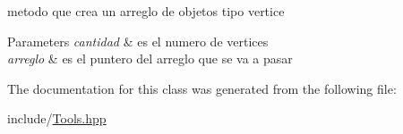 metodo que crea un arreglo de objetos tipo vertice 


\begin{DoxyParams}{Parameters}
{\em cantidad} & es el numero de vertices \\
\hline
{\em arreglo} & es el puntero del arreglo que se va a pasar \\
\hline
\end{DoxyParams}


The documentation for this class was generated from the following file\+:\begin{DoxyCompactItemize}
\item 
include/\hyperlink{_tools_8hpp}{Tools.\+hpp}\end{DoxyCompactItemize}

